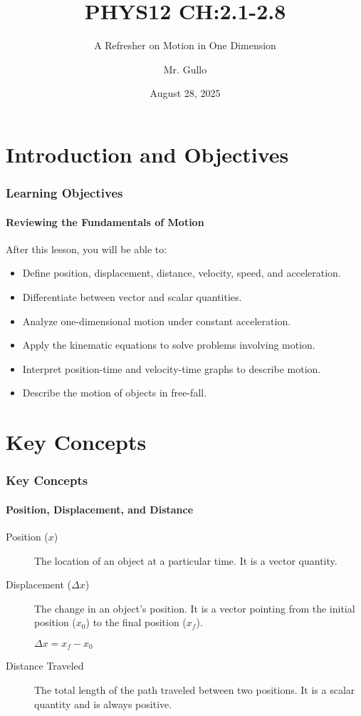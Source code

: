 \documentclass{beamer}
\title[1D Kinematics Review]{PHYS12 CH:2.1-2.8}
\subtitle{A Refresher on Motion in One Dimension}
\author[Mr. Gullo]{Mr. Gullo}
\date[Aug 28, 2025]{August 28, 2025}
\begin{document}
\frame{\titlepage}

\section{Introduction and Objectives}

\begin{frame}
\frametitle{Learning Objectives}
\framesubtitle{Reviewing the Fundamentals of Motion}
After this lesson, you will be able to:
\begin{itemize}
    \item Define position, displacement, distance, velocity, speed, and acceleration.
    \item Differentiate between vector and scalar quantities.
    \item Analyze one-dimensional motion under constant acceleration.
    \item Apply the kinematic equations to solve problems involving motion.
    \item Interpret position-time and velocity-time graphs to describe motion.
    \item Describe the motion of objects in free-fall.
\end{itemize}
\end{frame}

\section{Key Concepts}

\begin{frame}
\frametitle{Key Concepts}
\framesubtitle{Position, Displacement, and Distance}
\begin{description}
    \item[Position ($x$)] The location of an object at a particular time. It is a vector quantity.
    \pause
    \item[Displacement ($\Delta x$)] The change in an object's position. It is a vector pointing from the initial position ($x_0$) to the final position ($x_f$).
    \begin{center}
        $\Delta x = x_f - x_0$
    \end{center}
    \pause
    \item[Distance Traveled] The total length of the path traveled between two positions. It is a scalar quantity and is always positive.
\end{description}
\end{frame}
\end{document}

